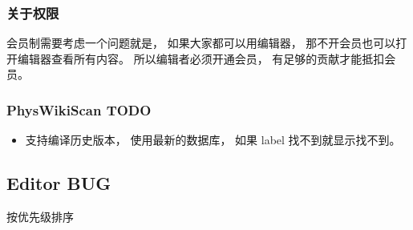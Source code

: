 \subsubsection{关于权限}
会员制需要考虑一个问题就是， 如果大家都可以用编辑器， 那不开会员也可以打开编辑器查看所有内容。 所以编辑者必须开通会员， 有足够的贡献才能抵扣会员。

\subsubsection{PhysWikiScan TODO}
\begin{itemize}
\item 支持编译历史版本， 使用最新的数据库， 如果 label 找不到就显示找不到。
\end{itemize}

\subsection{Editor BUG}
按优先级排序
